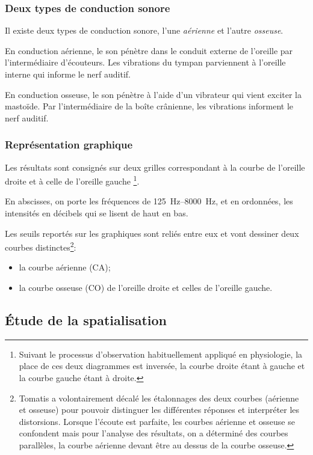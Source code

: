 \subsubsection{Deux types de conduction sonore}
Il existe deux types de conduction sonore, l'une \emph{aérienne} et l'autre \emph{osseuse}.

En conduction aérienne, le son pénètre dans le conduit externe de
l'oreille par l'intermédiaire d'écouteurs. Les vibrations du tympan
parviennent à l'oreille interne qui informe le nerf auditif.

En conduction osseuse, le son pénètre à l'aide d'un
vibrateur qui vient exciter la mastoïde. Par l'intermédiaire de la
boîte crânienne, les vibrations informent le nerf auditif.

\subsubsection{Représentation graphique}
Les résultats sont consignés sur deux grilles correspondant à la courbe
de l'oreille droite et à celle de l'oreille gauche%
\footnote{Suivant le processus d'observation habituellement appliqué en physiologie,
la place de ces deux diagrammes est inversée, la courbe droite étant
à gauche et la courbe gauche étant à droite.}.

En abscisses, on porte les fréquences de \SIrange{125}{8000}{\Hz}, et en ordonnées,
les intensités en décibels qui se lisent de haut en bas. 

Les seuils reportés sur les graphiques sont reliés entre eux et vont
dessiner deux courbes distinctes\footnote{Tomatis a volontairement décalé les étalonnages des deux courbes (aérienne
	et osseuse) pour pouvoir distinguer les différentes réponses et interpréter
	les distorsions. Lorsque l'écoute est parfaite, les
	courbes aérienne et osseuse se confondent mais pour l'analyse des
	résultats, on a déterminé des courbes parallèles, la courbe aérienne
	devant être au dessus de la courbe osseuse.}: 
\begin{itemize}
	\item la courbe aérienne (CA);
	\item la courbe osseuse (CO) de l'oreille droite et celles de l'oreille gauche.
\end{itemize}



\subsection{\'Etude de la spatialisation}

